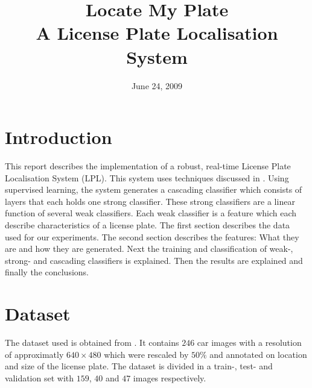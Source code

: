 \documentclass[a4paper,11pt]{article}
\title{Locate My Plate \\ A License Plate Localisation System}
\date{June 24, 2009}
\begin{document}
\maketitle
\section*{Introduction}
This report describes the implementation of a robust, real-time License Plate
Localisation System (LPL). This system uses techniques discussed in
\cite{dlagnekov_thesis, zhang}. Using supervised learning, the system generates
a cascading classifier which consists of layers that each holds one strong
classifier. These strong classifiers are a linear function of several weak
classifiers. Each weak classifier is a feature which each describe
characteristics of a license plate. The first section describes the data used
for our experiments. The second section describes the features: What they are
and how they are generated.  Next the training and classification of weak-,
strong- and cascading classifiers is explained. Then the results are explained
and finally the conclusions.

\section*{Dataset}
The dataset used is obtained from \cite{dlagnekov_dataset}. It contains $246$ car
images with a resolution of approximatly $640\times480$ which were rescaled by
$50\%$ and annotated on location and size of the license plate. The dataset is
divided in a train-, test- and validation set with $159$, $40$ and $47$ images
respectively.
\end{document}
